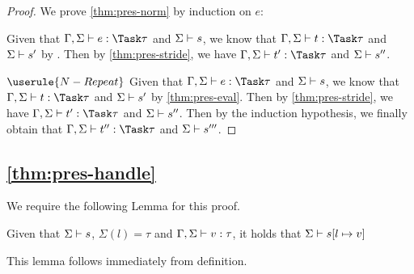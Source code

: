 \begin{proof}
  We prove \cref{thm:pres-norm} by induction on $e$:

    {Given that
    $\Gamma,\Sigma\infers e:\Task\tau$ and $\Sigma\vdash s$, we know that $\Gamma,\Sigma\infers t:\Task\tau$ and $\Sigma\vdash s'$ by
    .
    Then by \cref{thm:pres-stride}, we have $\Gamma,\Sigma\infers t':\Task\tau$ and $\Sigma\vdash s''$.}

  \case
    {$\userule{N-Repeat}$}
    { Given that $\Gamma,\Sigma\infers e:\Task\tau$ and $\Sigma\vdash s$, we know that $\Gamma,\Sigma\infers t:\Task\tau$ and $\Sigma\vdash s'$ by \cref{thm:pres-eval}.
    Then by \cref{thm:pres-stride}, we have $\Gamma,\Sigma\infers t':\Task\tau$ and $\Sigma\vdash s''$.
    Then by the induction hypothesis, we finally obtain that $\Gamma,\Sigma\infers t'':\Task\tau$ and $\Sigma\vdash s'''$.}

\end{proof}



\subsection{\cref{thm:pres-handle}}



We require the following Lemma for this proof.

\begin{lemma}
  Given that $\Sigma\vdash s$, $\Sigma(l)=\tau$ and $\Gamma,\Sigma\vdash v:\tau$, it holds that $\Sigma\vdash s[l\mapsto v]$
  \label{lemmasigmaconsistent}
\end{lemma}
This lemma follows immediately from definition.

